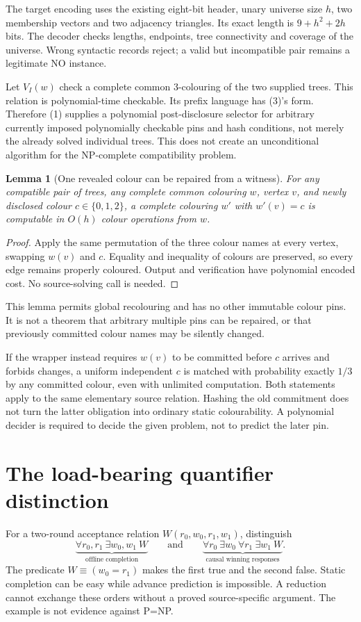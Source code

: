\documentclass[11pt]{article}
\newtheorem{lemma}[theorem]{Lemma}
\begin{document}
The target encoding uses the existing eight-bit header, unary universe size
$h$, two membership vectors and two adjacency triangles. Its exact length is
$9+h^2+2h$ bits. The decoder checks lengths, endpoints, tree connectivity and
coverage of the universe. Wrong syntactic records reject; a valid but
incompatible pair remains a legitimate NO instance.

Let $V_I(w)$ check a complete common 3-colouring of the two supplied trees.
This relation is polynomial-time checkable. Its prefix language has (3)'s
form. Therefore (1) supplies a polynomial post-disclosure selector for
arbitrary currently imposed polynomially checkable pins and hash conditions,
not merely the already solved individual trees. This does not create an
unconditional algorithm for the NP-complete compatibility problem.

\begin{lemma}[One revealed colour can be repaired from a witness]\label{lem:palette}
For any compatible pair of trees, any complete common colouring $w$, vertex
$v$, and newly disclosed colour $c\in\{0,1,2\}$, a complete colouring $w'$
with $w'(v)=c$ is computable in $O(h)$ colour operations from $w$.
\end{lemma}
\begin{proof}
Apply the same permutation of the three colour names at every vertex,
swapping $w(v)$ and $c$. Equality and inequality of colours are preserved,
so every edge remains properly coloured. Output and verification have
polynomial encoded cost. No source-solving call is needed.
\end{proof}
This lemma permits global recolouring and has no other immutable colour
pins. It is not a theorem that arbitrary multiple pins can be repaired, or
that previously committed colour names may be silently changed.

If the wrapper instead requires $w(v)$ to be committed before $c$ arrives
and forbids changes, a uniform independent $c$ is matched with probability
exactly $1/3$ by any committed colour, even with unlimited computation.
Both statements apply to the same elementary source relation. Hashing the
old commitment does not turn the latter obligation into ordinary static
colourability. A polynomial decider is required to decide the given problem,
not to predict the later pin.

\section{The load-bearing quantifier distinction}
For a two-round acceptance relation $W(r_0,w_0,r_1,w_1)$, distinguish
\[
 \underbrace{\forall r_0,r_1\ \exists w_0,w_1\ W}_{\text{offline completion}}
 \qquad\text{and}\qquad
 \underbrace{\forall r_0\ \exists w_0\ \forall r_1\ \exists w_1\ W}
 _{\text{causal winning responses}}.                    \tag{6}
\]
The predicate $W\equiv(w_0=r_1)$ makes the first true and the second false.
Static completion can be easy while advance prediction is impossible.
A reduction cannot exchange these orders without a proved source-specific
argument. The example is not evidence against P=NP.
\end{document}
